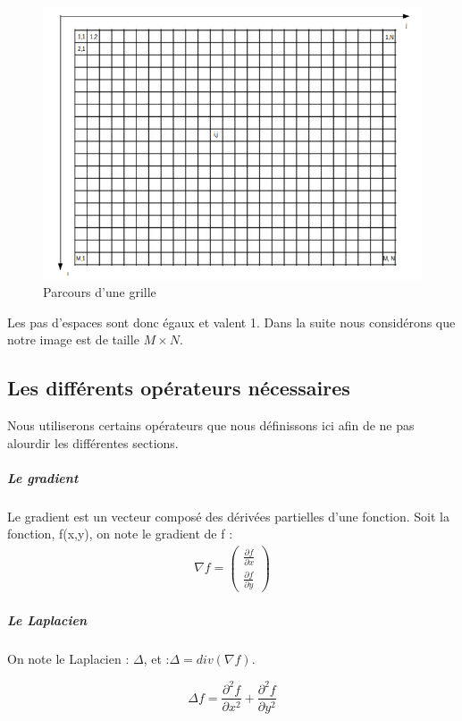 	\begin{figure}[!htb]
	\centering
	\includegraphics[scale=0.3]{Images/grille.png}
	\caption{Parcours d'une grille}
	\end{figure}
Les pas d'espaces sont donc égaux et valent 1. Dans la suite nous considérons que notre image est de taille $M \times N$.
\newpage


\subsection{Les différents opérateurs nécessaires}
Nous utiliserons certains opérateurs que nous définissons ici afin de ne pas alourdir les différentes sections. 
\subparagraph{Le gradient}
Le gradient est un vecteur composé des dérivées partielles d'une fonction. Soit la fonction, f(x,y), on note le gradient de f : 
\begin{equation*}
\begin{aligned}
\nabla f = \begin{pmatrix}
\frac{\partial f}{\partial x}\\
\frac{\partial f}{\partial y}
\end{pmatrix}
\end{aligned}
\end{equation*}
\subparagraph{Le Laplacien}
On note le Laplacien : $\Delta$, et :$\Delta = div(\nabla f)$.
\begin{center}
\begin{equation*}
    \Delta f  = \frac{\partial^2 f}{\partial x^2}+ \frac{\partial ^2 f}{\partial y^2}
\end{equation*}
\end{center}

